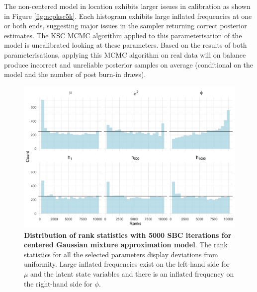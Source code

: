 \documentclass[12pt, a4paper]{article}
\begin{document}
    The non-centered model in location exhibits larger issues in calibration as shown in Figure \ref{fig:ncpksc5k}. Each histogram exhibits large inflated frequencies at one or both ends, suggesting major issues in the sampler returning correct posterior estimates. The KSC MCMC algorithm applied to this parameterisation of the model is uncalibrated looking at these parameters. Based on the results of both parameterisations, applying this MCMC algorithm on real data will on balance produce incorrect and unreliable posterior samples on average (conditional on the model and the number of post burn-in draws).
    \begin{figure}[H]
        \centering
        \includegraphics[scale=0.09]{results/ksc_cp_5k.png}
        \caption{\textbf{Distribution of rank statistics with 5000 SBC iterations for centered Gaussian mixture approximation model}. The rank statistics for all the selected parameters display deviations from uniformity. Large inflated frequencies exist on the left-hand side for $\mu$ and the latent state variables and there is an inflated frequency on the right-hand side for $\phi$.}
        \label{fig:cpksc5k}
    \end{figure}
\end{document}
